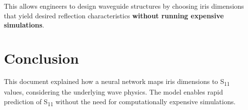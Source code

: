 \documentclass{article}
\begin{document}
This allows engineers to design waveguide structures by choosing iris dimensions that yield desired reflection characteristics \textbf{without running expensive simulations}.

\section{Conclusion}
This document explained how a neural network maps iris dimensions to S\textsubscript{11} values, considering the underlying wave physics. The model enables rapid prediction of S\textsubscript{11} without the need for computationally expensive simulations.
\end{document}
